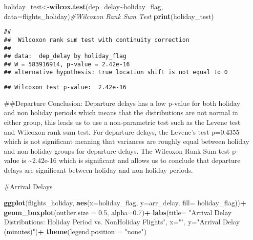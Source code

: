 \documentclass[
]{article}
\newenvironment{Shaded}{\begin{snugshade}}{\end{snugshade}}
\newcommand{\AttributeTok}[1]{\textcolor[rgb]{0.13,0.29,0.53}{#1}}
\newcommand{\CommentTok}[1]{\textcolor[rgb]{0.56,0.35,0.01}{\textit{#1}}}
\newcommand{\DecValTok}[1]{\textcolor[rgb]{0.00,0.00,0.81}{#1}}
\newcommand{\FloatTok}[1]{\textcolor[rgb]{0.00,0.00,0.81}{#1}}
\newcommand{\FunctionTok}[1]{\textcolor[rgb]{0.13,0.29,0.53}{\textbf{#1}}}
\newcommand{\NormalTok}[1]{#1}
\newcommand{\OtherTok}[1]{\textcolor[rgb]{0.56,0.35,0.01}{#1}}
\newcommand{\SpecialCharTok}[1]{\textcolor[rgb]{0.81,0.36,0.00}{\textbf{#1}}}
\newcommand{\StringTok}[1]{\textcolor[rgb]{0.31,0.60,0.02}{#1}}
\begin{document}
\begin{Shaded}
\begin{Highlighting}[]
\NormalTok{holiday\_test}\OtherTok{\textless{}{-}}\FunctionTok{wilcox.test}\NormalTok{(dep\_delay}\SpecialCharTok{\textasciitilde{}}\NormalTok{holiday\_flag, }\AttributeTok{data=}\NormalTok{flights\_holiday)}\CommentTok{\#Wilcoxon Rank Sum Test}
\FunctionTok{print}\NormalTok{(holiday\_test)}
\end{Highlighting}
\end{Shaded}

\begin{verbatim}
## 
##  Wilcoxon rank sum test with continuity correction
## 
## data:  dep_delay by holiday_flag
## W = 583916914, p-value = 2.42e-16
## alternative hypothesis: true location shift is not equal to 0
\end{verbatim}

\begin{Shaded}
\end{Shaded}

\begin{verbatim}
## Wilcoxon test p-value:  2.42e-16
\end{verbatim}

\#\#Departure Conclusion: Departure delays has a low p-value for both
holiday and non holiday periods which means that the distributions are
not normal in either group, this leads us to use a non-parametric test
such as the Levene test and Wilcoxon rank sum test. For departure
delays, the Levene's test p=0.4355 which is not significant meaning that
variances are roughly equal between holiday and non holiday groups for
departure delays. The Wilcoxon Rank Sum test p-value is
\textasciitilde2.42e-16 which is significant and allows us to conclude
that departure delays are significant between holiday and non holiday
periods.

\#Arrival Delays

\begin{Shaded}
\begin{Highlighting}[]
\FunctionTok{ggplot}\NormalTok{(flights\_holiday, }\FunctionTok{aes}\NormalTok{(}\AttributeTok{x=}\NormalTok{holiday\_flag, }\AttributeTok{y=}\NormalTok{arr\_delay, }\AttributeTok{fill=}\NormalTok{ holiday\_flag))}\SpecialCharTok{+}
  \FunctionTok{geom\_boxplot}\NormalTok{(}\AttributeTok{outlier.size =} \FloatTok{0.5}\NormalTok{, }\AttributeTok{alpha=}\FloatTok{0.7}\NormalTok{)}\SpecialCharTok{+}
  \FunctionTok{labs}\NormalTok{(}\AttributeTok{title=} \StringTok{"Arrival Delay Distributions: Holiday Period vs. NonHoliday Flights"}\NormalTok{,}
       \AttributeTok{x=}\StringTok{""}\NormalTok{, }\AttributeTok{y=}\StringTok{"Arrival Delay (minutes)"}\NormalTok{)}\SpecialCharTok{+}
  \FunctionTok{theme}\NormalTok{(}\AttributeTok{legend.position =} \StringTok{"none"}\NormalTok{)}
\end{Highlighting}
\end{Shaded}
\end{document}
